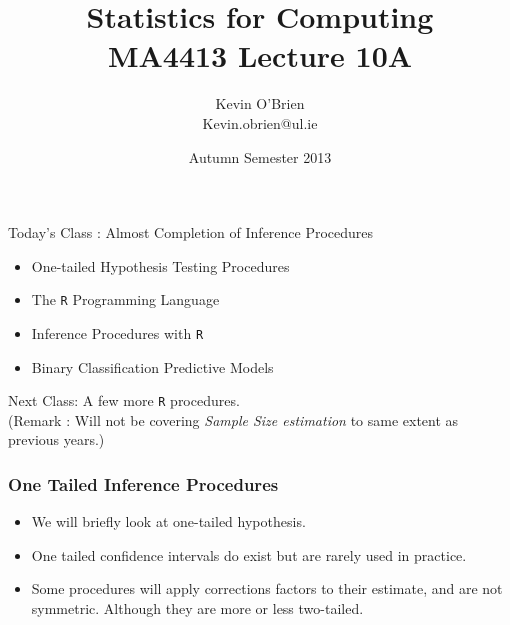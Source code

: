 \documentclass[a4]{beamer}
\title[MA4413]{Statistics for Computing \\ {\normalsize MA4413 Lecture 10A}}
\author[Kevin O'Brien]{Kevin O'Brien \\ {\scriptsize Kevin.obrien@ul.ie}}
\date{Autumn Semester 2013}
\institute[Maths \& Stats]{Dept. of Mathematics \& Statistics, \\ University \textit{of} Limerick}
\begin{document}
\begin{frame}
\titlepage
\end{frame}


\begin{frame}
Today's Class : Almost Completion of Inference Procedures
\begin{itemize}
\item One-tailed Hypothesis Testing Procedures
\item The \texttt{R} Programming Language
\item Inference Procedures with \texttt{R}
\item Binary Classification Predictive Models
\end{itemize}
Next Class: A few more \texttt{R} procedures.
\\
(Remark : Will not be covering \textit{Sample Size estimation} to same extent as previous years.)
\end{frame}
\begin{frame}
\frametitle{One Tailed Inference Procedures}
\begin{itemize}
\item We will briefly look at one-tailed hypothesis.
\item One tailed confidence intervals do exist but are rarely used in practice.
\item Some procedures will apply corrections factors to their estimate, and are not symmetric. Although they are more or less two-tailed.
\end{itemize}
\end{frame}


\end{document}
